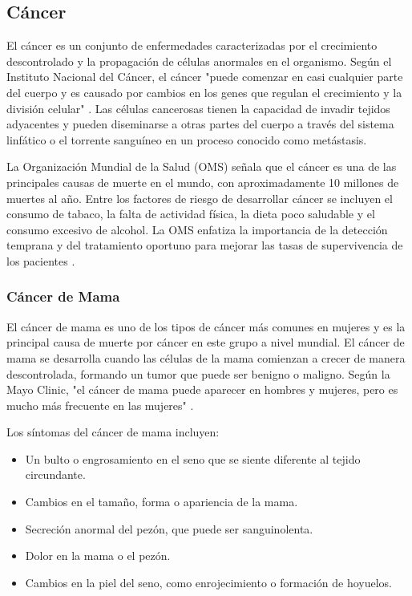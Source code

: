 \subsection{Cáncer}

El cáncer es un conjunto de enfermedades caracterizadas por el crecimiento descontrolado y la propagación de células anormales en el organismo. Según el Instituto Nacional del Cáncer, el cáncer "puede comenzar en casi cualquier parte del cuerpo y es causado por cambios en los genes que regulan el crecimiento y la división celular" \parencite{institutonacionalcancer2023}. Las células cancerosas tienen la capacidad de invadir tejidos adyacentes y pueden diseminarse a otras partes del cuerpo a través del sistema linfático o el torrente sanguíneo en un proceso conocido como metástasis.

La Organización Mundial de la Salud (OMS) señala que el cáncer es una de las principales causas de muerte en el mundo, con aproximadamente 10 millones de muertes al año. Entre los factores de riesgo de desarrollar cáncer se incluyen el consumo de tabaco, la falta de actividad física, la dieta poco saludable y el consumo excesivo de alcohol. La OMS enfatiza la importancia de la detección temprana y del tratamiento oportuno para mejorar las tasas de supervivencia de los pacientes \parencite{oms2023}.

\subsubsection{Cáncer de Mama}

El cáncer de mama es uno de los tipos de cáncer más comunes en mujeres y es la principal causa de muerte por cáncer en este grupo a nivel mundial. El cáncer de mama se desarrolla cuando las células de la mama comienzan a crecer de manera descontrolada, formando un tumor que puede ser benigno o maligno. Según la Mayo Clinic, "el cáncer de mama puede aparecer en hombres y mujeres, pero es mucho más frecuente en las mujeres" \parencite{mayoclinic2023}.

Los síntomas del cáncer de mama incluyen:
\begin{itemize}
    \item Un bulto o engrosamiento en el seno que se siente diferente al tejido circundante.
    \item Cambios en el tamaño, forma o apariencia de la mama.
    \item Secreción anormal del pezón, que puede ser sanguinolenta.
    \item Dolor en la mama o el pezón.
    \item Cambios en la piel del seno, como enrojecimiento o formación de hoyuelos.
\end{itemize}

